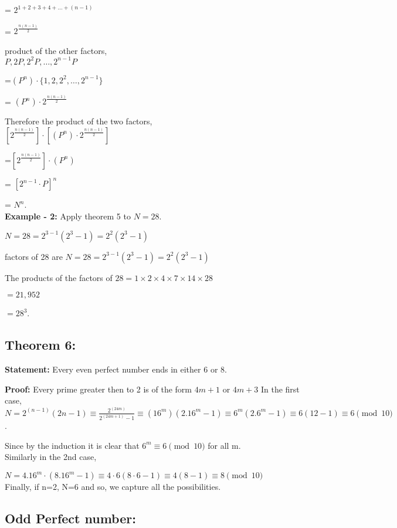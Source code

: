 \documentclass[12pt,,a4paper]{article}
\begin{document}
= \(2^{1+2+3+4+\ldots+(n-1)}\)

= \(2^{\frac{n(n-1)}{2}}\)

product of the other factors, \\
\(P, 2P, 2^2P, \ldots, 2^{n-1}P\)

=\((P^n) \cdot \{1, 2, 2^2, \ldots, 2^{n-1}\}\)

= \((P^n) \cdot 2^{\frac{n(n-1)}{2}}\)

Therefore the product of the two factors,\\
\([2^{\frac{n(n-1)}{2}}] \cdot [(P^n) \cdot 2^{\frac{n(n-1)}{2}}]\)

=\([2^{\frac{n(n-1)}{2}}] \cdot (P^n)\)

 = \([{2^{n-1} \cdot P}]^n\)

 = \(N^n\).\\

 \textbf{Example - 2:} Apply theorem 5 to \(N = 28\). 

\(N = 28 = 2^{3-1}(2^3-1) = 2^2(2^3-1)\)


factors of 28 are \(N = 28 = 2^{3-1}(2^3-1) = 2^2(2^3-1)\)


The products of the factors of \(28 = 1 \times 2 \times 4 \times 7 \times 14 \times 28\)

\(= 21,952\)


\(= 28^3\).\\

\subsection*{Theorem 6:}
\textbf{Statement:} Every even perfect number ends in either 6 or 8.

\textbf{Proof:}  Every prime greater then to 2 is of the form \(4m + 1\) or \(4m + 3\)
 In the first case,\\
\(N = 2^{(n-1)}(2n-1) \equiv \frac{2^{(24m)}}{2^{(24m+1)}-1} \equiv (16^m)(2.{16^m}-1) \equiv 6^m(2.{6^m}-1) \equiv 6(12-1) \equiv 6 \pmod{10}\).

Since by the induction it is clear that \(6^m \equiv 6 \pmod{10}\) for all m. \\
Similarly in the 2nd case,

\(N = 4.16^m \cdot (8.16^m-1) \equiv 4 \cdot 6 (8 \cdot 6-1) \equiv 4(8-1) \equiv 8 \pmod{10}\)
 \\
Finally, if n=2, N=6 and so, we capture all the possibilities. \\
\subsection{Odd Perfect number:}
\end{document}
